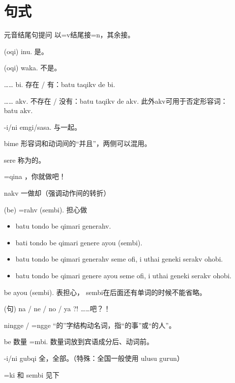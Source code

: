\pagebreak

\section{句式}

\begin{des}
    \item[元音结尾句提问] 以=v结尾接=n，其余接。
    \item[\A (oqi) \B inu.] 是。
    \item[\A (oqi) \B waka.] 不是。
    \item[…… bi.] 存在 / 有：batu taqikv de bi.
    \item[…… akv.] 不存在 / 没有：batu taqikv de akv. 此外akv可用于否定形容词：\\
        batu    akv.
    \item[\A \B -i/ni emgi/sasa.] \A 与\B 一起。
    \item[\lat{adj./v.} bime \lat{adj./v.}]  形容词和动词间的“并且”，两侧可以混用。
    \item[\A sere \B ] 称为\A 的\B 。
    \item[\A \V=qina] \A ，你就做\V 吧！
    \item[\V\ftn{命} nakv] 一做\V 却（强调动作间的转折）
    \item[\A \B (be) \V=rahv (sembi).] \A 担心\B 做\V 
    \begin{itemize}
        \item batu tondo be qimari generahv.
        \item bati tondo be qimari genere ayou (sembi).
        \item batu tondo be qimari generahv seme ofi, i uthai geneki serakv ohobi.
        \item batu tondo be qimari genere ayou seme ofi, i uthai geneki serakv ohobi.
    \end{itemize}
    \item[\A \B be \V\ftn{结句} ayou (sembi).] 表担心， sembi在后面还有单词的时候不能省略。
    \item[(句) na / ne / no / ya ?!] ……吧？！ 
    \item[\V\ftn{形} ningge / \V\ftn{形}\!=ngge ] “的”字结构动名词，指“\V 的事”或“\V 的人”。
    \item[\A \B be 数量 \V=mbi.]数量词放到宾语成分后、动词前。 
    \item[\A -i/ni gubqi] 全\A ，全部\A 。（特殊：全国一般使用 ulusu gurun） 
    \item[=ki 和 sembi] 见下

\end{des}
